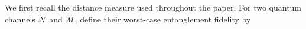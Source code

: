 \documentclass[10pt,twocolumn,superscriptaddress,aps,amsmath,amssymb,citeautoscript,floatfix,prx,longbibliography]{revtex4-2}
\theoremstyle{plain}
\theoremstyle{plain}
\theoremstyle{plain}
\theoremstyle{plain}
\theoremstyle{plain}
\theoremstyle{plain}
\begin{document}

We first recall the distance measure used throughout the paper. For two quantum channels \(\mathcal N\) and \(\mathcal M\), define their worst-case entanglement fidelity by
\end{document}
